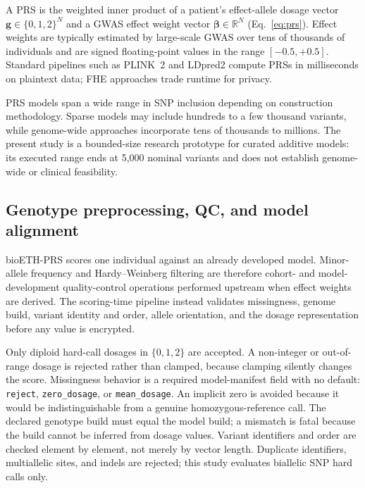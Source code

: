 \documentclass[10pt,twocolumn]{article}
\begin{document}
A PRS is the weighted inner product of a patient's effect-allele dosage vector
$\mathbf{g} \in \{0,1,2\}^N$ and a GWAS effect weight vector $\boldsymbol{\beta}
\in \mathbb{R}^N$ (Eq.~\ref{eq:prs}).  Effect weights are typically estimated by
large-scale GWAS over tens of thousands of individuals and are signed floating-point
values in the range $[-0.5, +0.5]$.  Standard pipelines such as PLINK~2
\citep{chang2015plink} and LDpred2 \citep{prive2020ldpred2} compute PRSs in
milliseconds on plaintext data; FHE approaches trade runtime for privacy.

PRS models span a wide range in SNP inclusion depending on construction methodology.
Sparse models may include hundreds to a few thousand variants, while genome-wide
approaches incorporate tens of thousands to millions.  The present study is a
bounded-size research prototype for curated additive models: its executed range ends
at 5,000 nominal variants and does not establish genome-wide or clinical feasibility.

\subsection{Genotype preprocessing, QC, and model alignment}
\label{sec:preprocessing}

bioETH-PRS scores one individual against an already developed model.  Minor-allele
frequency and Hardy--Weinberg filtering are therefore cohort- and model-development
quality-control operations performed upstream when effect weights are derived.  The
scoring-time pipeline instead validates missingness, genome build, variant identity and
order, allele orientation, and the dosage representation before any value is encrypted.

Only diploid hard-call dosages in $\{0,1,2\}$ are accepted.  A non-integer or
out-of-range dosage is rejected rather than clamped, because clamping silently changes
the score.  Missingness behavior is a required model-manifest field with no default:
\texttt{reject}, \texttt{zero\_dosage}, or \texttt{mean\_dosage}.  An implicit zero is
avoided because it would be indistinguishable from a genuine homozygous-reference call.
The declared genotype build must equal the model build; a mismatch is fatal because the
build cannot be inferred from dosage values.  Variant identifiers and order are checked
element by element, not merely by vector length.  Duplicate identifiers, multiallelic
sites, and indels are rejected; this study evaluates biallelic SNP hard calls only.
\end{document}
